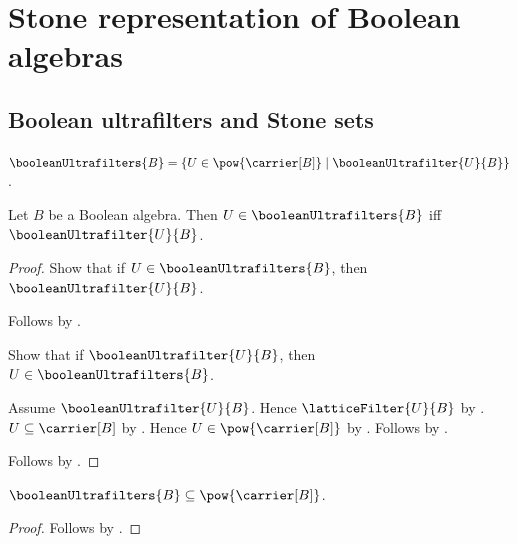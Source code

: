 \section{Stone representation of Boolean algebras}






\subsection{Boolean ultrafilters and Stone sets}

\begin{definition}\label{boolean_ultrafilters}
    $\booleanUltrafilters{B}=
        \{U\in\pow{\carrier[B]}\mid
            \booleanUltrafilter{U}{B}\}$.
\end{definition}

\begin{proposition}\label{boolean_ultrafilters_iff}
    Let $B$ be a Boolean algebra.
    Then $U\in\booleanUltrafilters{B}$ iff
        $\booleanUltrafilter{U}{B}$.
\end{proposition}
\begin{proof}
    Show that if $U\in\booleanUltrafilters{B}$, then
        $\booleanUltrafilter{U}{B}$.
    \begin{subproof}
        Follows by .
    \end{subproof}
    Show that if $\booleanUltrafilter{U}{B}$, then
        $U\in\booleanUltrafilters{B}$.
    \begin{subproof}
        Assume $\booleanUltrafilter{U}{B}$.
        Hence $\latticeFilter{U}{B}$ by
            .
        $U\subseteq\carrier[B]$ by
            .
        Hence $U\in\pow{\carrier[B]}$ by
            .
        Follows by .
    \end{subproof}
    Follows by \auto.
\end{proof}

\begin{proposition}\label{boolean_ultrafilters_subseteq_powerset}
    $\booleanUltrafilters{B}\subseteq\pow{\carrier[B]}$.
\end{proposition}
\begin{proof}
    Follows by .
\end{proof}

